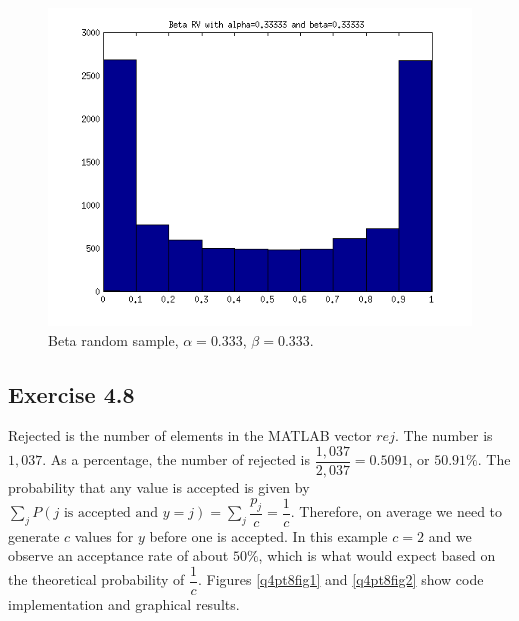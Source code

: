 \documentclass[12pt,a4paper]{article}
\begin{document}
\begin{figure}[ht!]
\begin{center}
\includegraphics[scale=.80]{q4pt7_hist2.png}
\caption{Beta random sample, $\alpha=0.333$, $\beta=0.333$.}
\label{q4pt7fig3}
\end{center}
\end{figure}
\FloatBarrier

\subsection*{Exercise 4.8}

Rejected is the number of elements in the MATLAB vector $rej$. The number is $1,037$. As a percentage, the number of rejected is $\dfrac{1,037}{2,037}=0.5091$, or $50.91\%$. The probability that any value is accepted is given by $\displaystyle\sum_j P(j \text{ is accepted and } y = j)=\displaystyle\sum_j\dfrac{p_j}{c}=\dfrac{1}{c}$. Therefore, on average we need to generate $c$ values for $y$ before one is accepted. In this example $c=2$ and we observe an acceptance rate of about $50\%$, which is what would expect based on the theoretical probability of $\dfrac{1}{c}$. Figures \ref{q4pt8fig1} and \ref{q4pt8fig2} show code implementation and graphical results.
\end{document}
